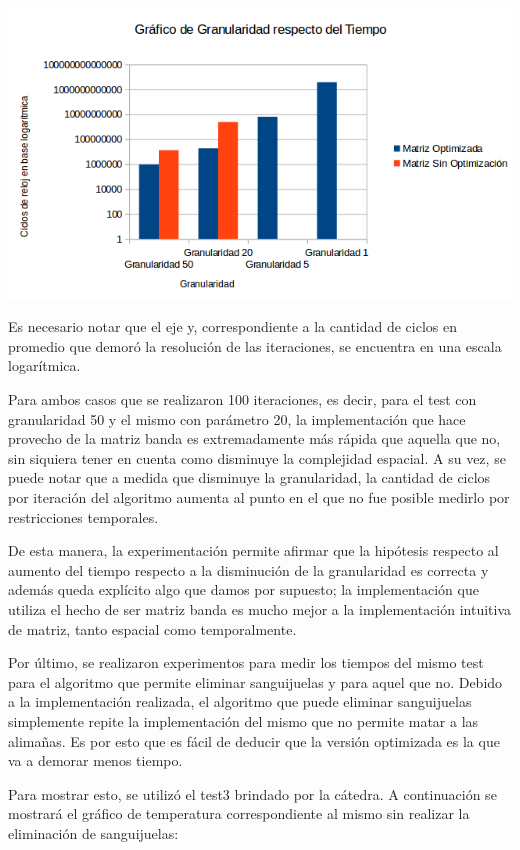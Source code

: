 	\par 
	\begin{center}
		\includegraphics[scale=0.7]{./img/granularidad/granularidadrespectotiempo.png}
	\end{center}
	
	\par 
	Es necesario notar que el eje y, correspondiente a la cantidad de ciclos en promedio que demoró la resolución de las iteraciones, se encuentra en una escala logarítmica. 
	\par 
	Para ambos casos que se realizaron 100 iteraciones, es decir, para el test con granularidad 50 y el mismo con parámetro 20, la implementación que hace provecho de la matriz banda es extremadamente más rápida que aquella que no, sin siquiera tener en cuenta como disminuye la complejidad espacial. A su vez, se puede notar que a medida que disminuye la granularidad, la cantidad de ciclos por iteración del algoritmo aumenta al punto en el que no fue posible medirlo por restricciones temporales. 
	\par 
	De esta manera, la experimentación permite afirmar que la hipótesis respecto al aumento del tiempo respecto a la disminución de la granularidad es correcta y además queda explícito algo que damos por supuesto; la implementación que utiliza el hecho de ser matriz banda es mucho mejor a la implementación intuitiva de matriz, tanto espacial como temporalmente.
	
	\par 
	
	Por último, se realizaron experimentos para medir los tiempos del mismo test para el algoritmo que permite eliminar sanguijuelas y para aquel que no. 
	Debido a la implementación realizada, el algoritmo que puede eliminar sanguijuelas simplemente repite la implementación del mismo que no permite matar a las alimañas. Es por esto que es fácil de deducir que la versión optimizada es la que va a demorar menos tiempo. 
	\par 
	Para mostrar esto, se utilizó el test3 brindado por la cátedra. A continuación se mostrará el gráfico de temperatura correspondiente al mismo sin realizar la eliminación de sanguijuelas:
	
